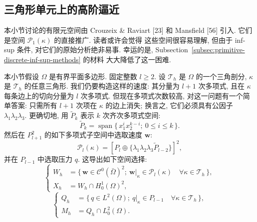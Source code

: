 \subsection{三角形单元上的高阶逼近}
\label{subsec:primitive-triangle-higher-order}

本小节讨论的有限元空间由 Crouzeix \& Raviart [23] 和 Mansfield [56]
引入. 它们是空间 $\mathcal{P}_1(\kappa)$ 的直接推广. 读者或许会觉得
这些空间很容易理解, 但由于 inf-sup 条件, 对它们的原始分析绝非易事.
幸运的是, Subsection~\ref{subsec:primitive-discrete-inf-sup-methods} 的材料
大大降低了这一困难.

本小节假设 $\Omega$ 是有界平面多边形. 固定整数 $l\geq2$.
设 $\mathcal{T}_h$ 是 $\Omega$ 的一个三角剖分, $\kappa$ 是
$\mathcal{T}_h$ 的任意三角形. 我们仍要构造这样的速度: 其分量为
$l+1$ 次多项式, 且在 $\kappa$ 每条边上的切向分量为 $l$ 次多项式.
但现在多项式次数较高, 对这一问题有一个简单答案: 只需所有 $l+1$
次项在 $\kappa$ 的边上消失; 换言之, 它们必须具有公因子
$\lambda_1\lambda_2\lambda_3$. 更确切地, 用 $\widetilde P_k$
表示 $k$ 次齐次多项式空间:
\[
\widetilde P_k
=\operatorname{span}\{\,x_1^ix_2^{k-i};\ 0\leq i\leq k\,\}.
\]
然后在 $P_{l+1}^2$ 的如下多项式子空间中选取速度 $\mathbf w$:
\begin{equation}\label{eq:primitive-triangle-higher-local-velocity}
\mathcal{P}_l(\kappa)
=\left[P_l\oplus\{\lambda_1\lambda_2\lambda_3\widetilde P_{l-2}\}\right]^2,
\end{equation}
并在 $P_{l-1}$ 中选取压力 $q$. 这导出如下空间选择:
\begin{equation}\label{eq:primitive-triangle-higher-velocity-spaces}
\left\{
\begin{aligned}
W_h&=\{\,\mathbf w\in\mathcal{C}^0(\bar\Omega)^2;
\ \mathbf w|_\kappa\in\mathcal{P}_l(\kappa)
\quad\forall\kappa\in\mathcal{T}_h\,\},\\
X_h&=W_h\cap H_0^1(\Omega)^2,
\end{aligned}
\right.
\end{equation}
\begin{equation}\label{eq:primitive-triangle-higher-pressure-spaces}
\left\{
\begin{aligned}
Q_h&=\{\,q\in L^2(\Omega);
\ q|_\kappa\in P_{l-1}\quad\forall\kappa\in\mathcal{T}_h\,\},\\
M_h&=Q_h\cap L_0^2(\Omega).
\end{aligned}
\right.
\end{equation}


